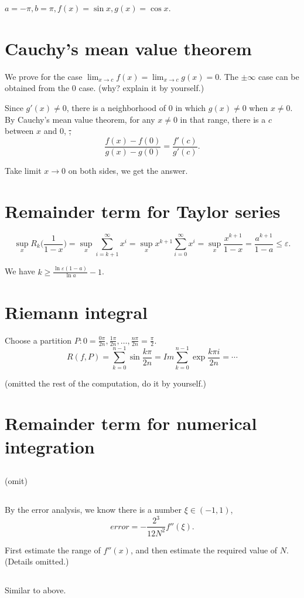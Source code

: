 \(a=-\pi, b=\pi, f(x) = \sin x, g(x) = \cos x \).

\section{Cauchy's mean value theorem} %

We prove for the case \(\lim_{x\to c}f(x)=\lim_{x\to c}g(x)=0\). The \(\pm\infty \) case can be obtained from the 0 case. (why? explain it by yourself.)

Since \(g'(x)\ne0\), there is a neighborhood of \(0\) in which \(g(x)\ne0\) when \(x\ne0\).
By Cauchy's mean value theorem, for any \(x\ne 0\) in that range, there is a \(c\) between \(x\) and 0, \st,
\[\frac{f(x)-f(0)}{g(x)-g(0)}=\frac{f'(c)}{g'(c)}.\]

Take limit \(x\to0\) on both sides, we get the answer.

\section{Remainder term for Taylor series} %

\[\sup_x R_k\bigg(\frac{1}{1-x}\bigg) =\sup_x  \sum_{i=k+1}^\infty x^i=\sup_x x^{k+1}\sum_{i=0}^\infty x^i=\sup_x \frac{x^{k+1}}{1-x}=\frac{a^{k+1}}{1-a}\le\varepsilon.\]

We have \(k\ge \frac{\ln \varepsilon(1-a)}{\ln a}-1\).

\section{Riemann integral} %

Choose a partition \(P: 0 = \frac{0\pi}{2n}, \frac{1\pi}{2n}, \dots, \frac{n\pi}{2n}=\frac{\pi}{2}\).
\[R(f, P) = \sum_{k=0}^{n-1}\sin \frac{k\pi}{2n} = Im\sum_{k=0}^{n-1}\exp \frac{k\pi i}{2n} = \cdots \]

(omitted the rest of the computation, do it by yourself.)

\section{Remainder term for numerical integration} %

\subsection{} %

(omit)

\subsection{} %

By the error analysis, we know there is a number \(\xi\in(-1, 1)\),
\[error = -\frac{2^3}{12N^2}f''(\xi).\]

First estimate the range of \(f''(x)\), and then estimate the required value of \(N\).
(Details omitted.)

\subsection{} %

Similar to above.
